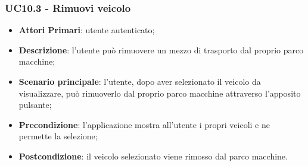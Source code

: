 \subsubsection{UC10.3 - Rimuovi veicolo}
\begin{itemize}
	\item \textbf{Attori Primari}: utente autenticato;
	\item \textbf{Descrizione}: l'utente può rimuovere un mezzo di trasporto dal proprio parco macchine;
	\item \textbf{Scenario principale}: l'utente, dopo aver selezionato il veicolo da visualizzare, può rimuoverlo dal proprio parco macchine attraverso l'apposito pulsante;
	\item \textbf{Precondizione}: l'applicazione mostra all'utente i propri veicoli e ne permette la selezione;
	\item \textbf{Postcondizione}: il veicolo selezionato viene rimosso dal parco macchine.
\end{itemize}